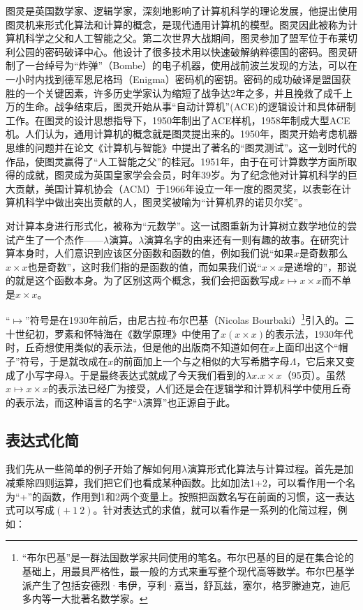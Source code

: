 \documentclass[b5paper]{ctexart}
\begin{document}
图灵是英国数学家、逻辑学家，深刻地影响了计算机科学的理论发展，他提出使用图灵机来形式化算法和计算的概念，是现代通用计算机的模型。图灵因此被称为计算机科学之父和人工智能之父\cite{wiki-Turing}。第二次世界大战期间，图灵参加了盟军位于布莱切利公园的密码破译中心。他设计了很多技术用以快速破解纳粹德国的密码。图灵研制了一台绰号为“炸弹”（Bombe）的电子机器，使用战前波兰发现的方法，可以在一小时内找到德军恩尼格玛（Enigma）密码机的密钥。密码的成功破译是盟国获胜的一个关键因素，许多历史学家认为缩短了战争达2年之多，并且挽救了成千上万的生命。战争结束后，图灵开始从事“自动计算机”(ACE)的逻辑设计和具体研制工作。在图灵的设计思想指导下，1950年制出了ACE样机，1958年制成大型ACE机。人们认为，通用计算机的概念就是图灵提出来的。1950年，图灵开始考虑机器思维的问题并在论文《计算机与智能》中提出了著名的“图灵测试”。这一划时代的作品，使图灵赢得了“人工智能之父”的桂冠。1951年，由于在可计算数学方面所取得的成就，图灵成为英国皇家学会会员，时年39岁。为了纪念他对计算机科学的巨大贡献，美国计算机协会（ACM）于1966年设立一年一度的图灵奖，以表彰在计算机科学中做出突出贡献的人，图灵奖被喻为“计算机界的诺贝尔奖”。

对计算本身进行形式化，被称为“元数学”。这一试图重新为计算树立数学地位的尝试产生了一个杰作——$\lambda$演算。$\lambda$演算名字的由来还有一则有趣的故事。在研究计算本身时，人们意识到应该区分函数和函数的值，例如我们说“如果$x$是奇数那么$x \times x$也是奇数”，这时我们指的是函数的值，而如果我们说“$x \times x$是递增的”，那说的就是这个函数本身。为了区别这两个概念，我们会把函数写成$x \mapsto x \times x$而不单是$x \times x$。

“$\mapsto$”符号是在1930年前后，由尼古拉$\cdot$布尔巴基（Nicolas Bourbaki）\footnote{“布尔巴基”是一群法国数学家共同使用的笔名。布尔巴基的目的是在集合论的基础上，用最具严格性，最一般的方式来重写整个现代高等数学。布尔巴基学派产生了包括安德烈·韦伊，亨利·嘉当，舒瓦兹，塞尔，格罗滕迪克，迪厄多内等一大批著名数学家。}引入的。二十世纪初，罗素和怀特海在《数学原理》中使用了$\hat{x}(x \times x)$的表示法，1930年代时，丘奇想使用类似的表示法，但是他的出版商不知道如何在$x$上面印出这个“帽子”符号，于是就改成在$x$的前面加上一个与之相似的大写希腊字母$\Lambda$，它后来又变成了小写字母$\lambda$。于是最终表达式就成了今天我们看到的$\lambda x . x \times x$\cite{Dowek2011}（95页）。虽然$x \mapsto x \times x$的表示法已经广为接受，人们还是会在逻辑学和计算机科学中使用丘奇的表示法，而这种语言的名字“$\lambda$演算”也正源自于此。

\subsection{表达式化简}
我们先从一些简单的例子开始了解如何用$\lambda$演算形式化算法与计算过程。首先是加减乘除四则运算，我们把它们也看成某种函数。比如加法1+2，可以看作用一个名为“+”的函数，作用到1和2两个变量上。按照把函数名写在前面的习惯，这一表达式可以写成$(+\ 1\ 2)$。针对表达式的求值，就可以看作是一系列的化简过程，例如：
\end{document}
